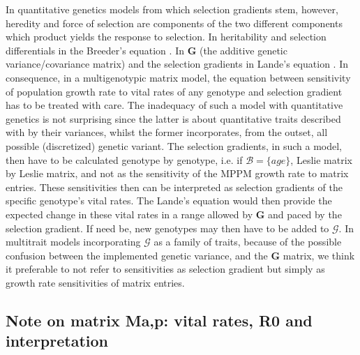 \documentclass[10pt,a4paper]{article}
\begin{document}
In quantitative genetics models from which selection gradients stem, however, heredity and force of selection are components of the two different components which product yields the response to selection. In heritability and selection differentials in the Breeder's equation \citep{Lush1937}. In $\mathbf{G}$ (the additive genetic variance/covariance matrix) and the selection gradients in Lande's equation \citep{Lande1982}.
In consequence, in a multigenotypic matrix model, the equation between sensitivity of population growth rate to vital rates of any genotype and selection gradient has to be treated with care. The inadequacy of such a model with quantitative genetics is not surprising since the latter is about quantitative traits described with by their variances, whilst the former incorporates, from the outset, all possible (discretized) genetic variant.  %
The selection gradients, in such a model, then have to be calculated genotype by genotype, i.e. if $\mathcal{B}=\lbrace age\rbrace$, Leslie matrix by Leslie matrix, and not as the sensitivity of the MPPM growth rate to matrix entries. These sensitivities then can be interpreted as selection gradients of the specific genotype's vital rates. The Lande’s equation would then provide the expected change in these vital rates in a range allowed by $\mathbf{G}$ and paced by the selection gradient. If need be, new genotypes may then have to be added to $\mathcal{G}$. %
In multitrait models incorporating $\mathcal{G}$ as a family of traits, because of the possible confusion between the implemented genetic variance, and the $\mathbf{G}$ matrix, we think it preferable to not refer to sensitivities as selection gradient but simply as growth rate sensitivities of matrix entries.

\subsection{Note on matrix Ma,p: vital rates,  R0 and interpretation}
\label{sec:Map}
\end{document}
